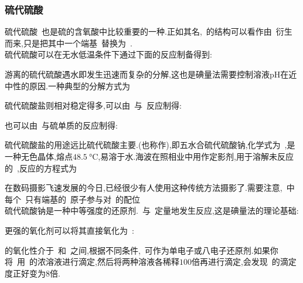 \documentclass{ctexbook}
\begin{document}
\subsubsection{硫代硫酸~}
硫代硫酸~也是硫的含氧酸中比较重要的一种.正如其名,~的结构可以看作由~衍生而来,只是把其中一个端基~替换为~.\\
\indent 硫代硫酸可以在无水低温条件下通过下面的反应制备得到:
\begin{tightcenter}
\end{tightcenter}
游离的硫代硫酸遇水即发生迅速而复杂的分解,这也是碘量法需要控制溶液pH在近中性的原因.一种典型的分解方式为
\begin{tightcenter}
\end{tightcenter}
硫代硫酸盐则相对稳定得多,可以由~与~反应制得:
\begin{tightcenter}
\end{tightcenter}
也可以由~与硫单质的反应制得:
\begin{tightcenter}
\end{tightcenter}
\indent 硫代硫酸盐的用途远比硫代硫酸主要.(也称作),即五水合硫代硫酸钠,化学式为~,是一种无色晶体,熔点$\SI{48.5}{\celsius}$,易溶于水.海波在照相业中用作定影剂,用于溶解未反应的~,反应的方程式为
\begin{tightcenter}
\end{tightcenter}
在数码摄影飞速发展的今日,已经很少有人使用这种传统方法摄影了.需要注意,~中每个~只有端基的~原子参与对~的配位\\
\indent 硫代硫酸钠是一种中等强度的还原剂.~与~定量地发生反应,这是碘量法的理论基础:
\begin{tightcenter}
\end{tightcenter}
更强的氧化剂可以将其直接氧化为~:
\begin{tightcenter}
\end{tightcenter}
的氧化性介于~和~之间,根据不同条件,~可作为单电子或八电子还原剂.如果你将~用~的浓溶液进行滴定,然后将两种溶液各稀释$100$倍再进行滴定,会发现~的滴定度正好变为$8$倍.
\end{document}
